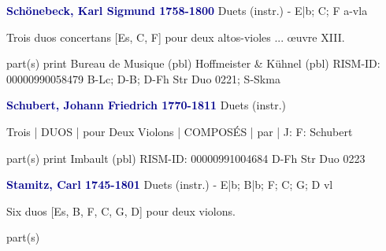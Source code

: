 \documentclass[twocolumn]{book}
\begin{document}
\newline \par \vspace{7pt} \textcolor{darkblue}{\textbf{Schönebeck, Karl Sigmund  1758-1800}}
\newline Duets (instr.) - E|b; C; F
 a-vla
\newline \begin{itshape}Trois duos concertans [Es, C, F] pour deux altos-violes ... œuvre XIII.\end{itshape} 
\newline \textcolor{darkblue}{}  part(s)
\newline print
\newline Bureau de Musique  (pbl)
\newline Hoffmeister \& Kühnel  (pbl)
\newline RISM-ID: 00000990058479
\newline B-Lc; D-B; D-Fh  Str Duo 0221; S-Skma
\newline \par \vspace{7pt} \textcolor{darkblue}{\textbf{Schubert, Johann Friedrich  1770-1811}}
\newline Duets (instr.)
\newline \begin{itshape}Trois | DUOS | pour Deux Violons | COMPOSÉS | par | J: F: Schubert\end{itshape} 
\newline \textcolor{darkblue}{}  part(s)
\newline print
\newline Imbault  (pbl)
\newline RISM-ID: 00000991004684
\newline D-Fh  Str Duo 0223
\newline \par \vspace{7pt} \textcolor{darkblue}{\textbf{Stamitz, Carl  1745-1801}}
\newline Duets (instr.) - E|b; B|b; F; C; G; D
 vl
\newline \begin{itshape}Six duos [Es, B, F, C, G, D] pour deux violons.\end{itshape} 
\newline \textcolor{darkblue}{}  part(s)
\end{document}
